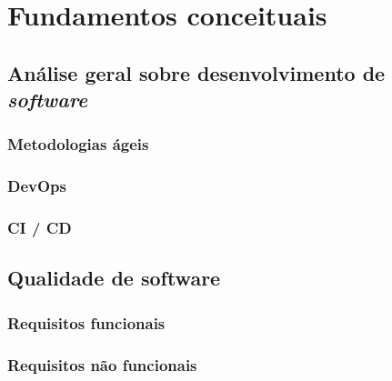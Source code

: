 \documentclass[]{../class/politex}
\begin{document}
  \capa
  \falsafolhaderosto
  \folhaderosto


  


  

  \listadefiguras

  \listadetabelas

  \sumario

  

  \part{Fundamentos conceituais}

    \chapter{Análise geral sobre desenvolvimento de \textit{software}}

      \section{Metodologias ágeis}

      \section{DevOps}

      \section{CI / CD}

    \chapter{Qualidade de software}

      \section{Requisitos funcionais}

      \section{Requisitos não funcionais}
\end{document}
